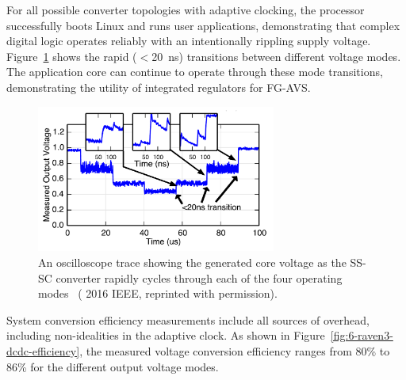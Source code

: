 \documentclass[graybox]{svmult}
\begin{document}
For all possible converter topologies with adaptive clocking, the processor successfully boots Linux and runs user applications, demonstrating that complex digital logic operates reliably with an intentionally rippling supply voltage.
Figure~\ref{fig:6-raven3-dcdc-modes} shows the rapid ($<$\SI{20}{\nano\second}) transitions between different voltage modes.
The application core can continue to operate through these mode transitions, demonstrating the utility of integrated regulators for FG-AVS.

\begin{figure}
  \centering
  \includegraphics[width=0.7\textwidth]{6-raven3-dcdc-modes}
  \caption{An oscilloscope trace showing the generated core voltage as the SS-SC converter rapidly cycles through each of the four operating modes~\cite{Zimmer2016} ({\textcopyright} 2016 IEEE, reprinted with permission).}
  \label{fig:6-raven3-dcdc-modes}
\end{figure}


System conversion efficiency measurements include all sources of overhead, including non-idealities in the adaptive clock.
As shown in Figure~\ref{fig:6-raven3-dcdc-efficiency}, the measured voltage conversion efficiency ranges from 80\% to 86\% for the different output voltage modes.
\end{document}
